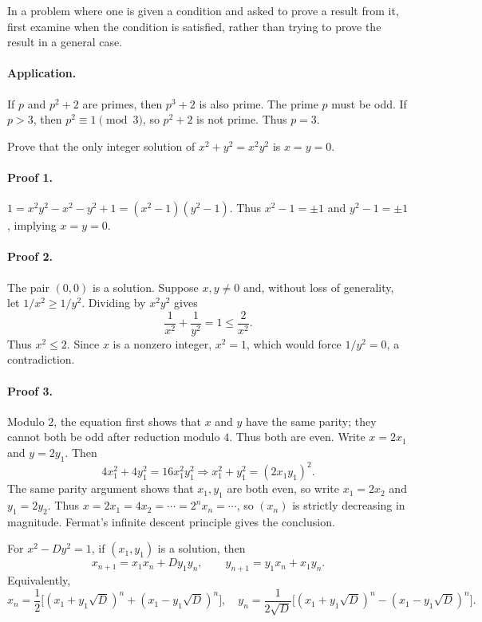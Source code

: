 \documentclass[11pt,a4paper]{article}
\begin{document}
\setcounter{theorem}{16}\begin{lemma}
In a problem where one is given a condition and asked to prove a result from it, first examine when the condition is satisfied, rather than trying to prove the result in a general case.
\end{lemma}
\paragraph{Application.}
If $p$ and $p^2+2$ are primes, then $p^3+2$ is also prime.
The prime $p$ must be odd. If $p>3$, then $p^2\equiv1\pmod3$, so $p^2+2$ is not prime.
Thus $p=3$.

Prove that the only integer solution of $x^2+y^2=x^2y^2$ is $x=y=0$.
\paragraph{Proof 1.}
$1=x^2y^2-x^2-y^2+1=(x^2-1)(y^2-1)$.
Thus $x^2-1=\pm1$ and $y^2-1=\pm1$, implying $x=y=0$.
\paragraph{Proof 2.}
The pair $(0,0)$ is a solution. Suppose $x,y\ne0$ and, without loss of
generality, let $1/x^2\geq1/y^2$. Dividing by $x^2y^2$ gives
\[
\frac1{x^2}+\frac1{y^2}=1\leq\frac2{x^2}.
\]
Thus $x^2\leq2$. Since $x$ is a nonzero integer, $x^2=1$, which would
force $1/y^2=0$, a contradiction.
\paragraph{Proof 3.}
Modulo $2$, the equation first shows that $x$ and $y$ have the same parity;
they cannot both be odd after reduction modulo $4$. Thus both are even.
Write $x=2x_1$ and $y=2y_1$. Then
\[
4x_1^2+4y_1^2=16x_1^2y_1^2
\Longrightarrow x_1^2+y_1^2=(2x_1y_1)^2.
\]
The same parity argument shows that $x_1,y_1$ are both even, so write
$x_1=2x_2$ and $y_1=2y_2$.
Thus $x=2x_1=4x_2=\cdots=2^nx_n=\cdots$, so $(x_n)$ is strictly decreasing in magnitude.
Fermat's infinite descent principle gives the conclusion.

\setcounter{theorem}{17}\begin{lemma}
For $x^2-Dy^2=1$, if $(x_1,y_1)$ is a solution, then
\[
x_{n+1}=x_1x_n+Dy_1y_n,\qquad y_{n+1}=y_1x_n+x_1y_n.
\]
Equivalently,
\[
x_n=\frac12\bigl[(x_1+y_1\sqrt D)^n+(x_1-y_1\sqrt D)^n\bigr],\quad
y_n=\frac1{2\sqrt D}\bigl[(x_1+y_1\sqrt D)^n-(x_1-y_1\sqrt D)^n\bigr].
\]
\end{lemma}
\end{document}
